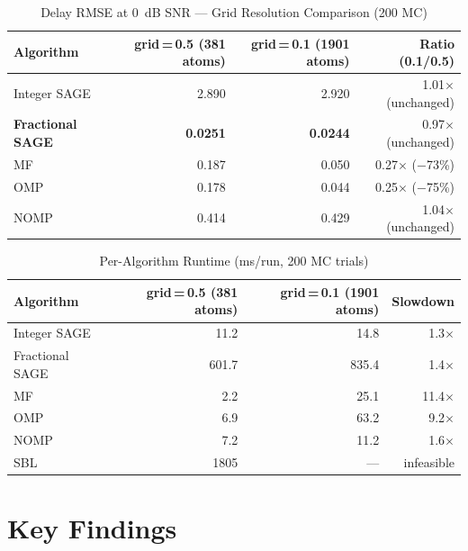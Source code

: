 \documentclass[11pt,a4paper]{article}
\begin{document}
\begin{table}[ht]
\centering
\caption{Delay RMSE at \SI{0}{dB} SNR --- Grid Resolution Comparison (200 MC)}
\label{tab:grid}
\small
\begin{tabular}{@{}lrrr@{}}
\toprule
Algorithm & grid$\,$=$\,$0.5 (381 atoms) & grid$\,$=$\,$0.1 (1901 atoms) & Ratio (0.1/0.5) \\
\midrule
Integer SAGE   & 2.890 & 2.920 & 1.01$\times$ (unchanged) \\
\textbf{Fractional SAGE} & \textbf{0.0251} & \textbf{0.0244} & 0.97$\times$ (unchanged) \\
MF             & 0.187 & 0.050 & 0.27$\times$ ($-$73\%) \\
OMP            & 0.178 & 0.044 & 0.25$\times$ ($-$75\%) \\
NOMP           & 0.414 & 0.429 & 1.04$\times$ (unchanged) \\
\bottomrule
\end{tabular}
\end{table}

\begin{table}[ht]
\centering
\caption{Per-Algorithm Runtime (ms/run, 200 MC trials)}
\label{tab:timing}
\small
\begin{tabular}{@{}lrrr@{}}
\toprule
Algorithm & grid$\,$=$\,$0.5 (381 atoms) & grid$\,$=$\,$0.1 (1901 atoms) & Slowdown \\
\midrule
Integer SAGE   & 11.2 & 14.8 & 1.3$\times$ \\
Fractional SAGE & 601.7 & 835.4 & 1.4$\times$ \\
MF             & 2.2  & 25.1 & 11.4$\times$ \\
OMP            & 6.9  & 63.2 & 9.2$\times$ \\
NOMP           & 7.2  & 11.2 & 1.6$\times$ \\
SBL            & 1805 & --- & infeasible \\
\bottomrule
\end{tabular}
\end{table}

\section{Key Findings}
\end{document}
